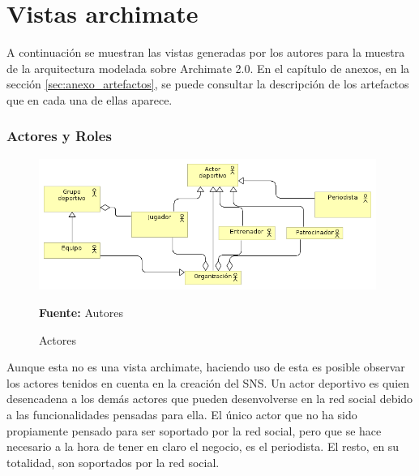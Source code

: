 \section{Vistas archimate}

A continuación se muestran las vistas generadas por los autores para la muestra de la arquitectura modelada sobre Archimate 2.0. En el capítulo de anexos, en la sección \ref{sec:anexo_artefactos}, se puede consultar la descripción de los artefactos que en cada una de ellas aparece.

\subsubsection{Actores y Roles}

\begin{figure}[!htb]
  \begin{center}
    \includegraphics[width=11cm]{./imagenes/actores.png}
    \caption{Actores}
    \label{fig:Actores}
    \textbf{Fuente:}  Autores
  \end{center}
\end{figure}

Aunque esta no es una vista archimate, haciendo uso de esta es posible observar los actores tenidos en cuenta en la creación del SNS. Un actor deportivo es quien desencadena a los demás actores que pueden desenvolverse en la red social debido a las funcionalidades pensadas para ella. El único actor que no ha sido propiamente pensado para ser soportado por la red social, pero que se hace necesario a la hora de tener en claro el negocio, es el periodista. El resto, en su totalidad, son soportados por la red social.

